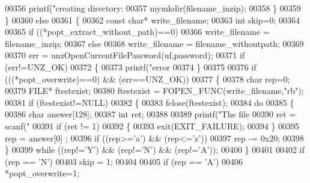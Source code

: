 \begin{DoxyCode}
{{{{{{{{{00356             printf(\textcolor{stringliteral}{"creating directory: %
00357             mymkdir(filename\_inzip);
00358         \}
00359     \}
00360     \textcolor{keywordflow}{else}
00361     \{
00362         \textcolor{keyword}{const} \textcolor{keywordtype}{char}* write\_filename;
00363         \textcolor{keywordtype}{int} skip=0;
00364 
00365         \textcolor{keywordflow}{if} ((*popt\_extract\_without\_path)==0)
00366             write\_filename = filename\_inzip;
00367         \textcolor{keywordflow}{else}
00368             write\_filename = filename\_withoutpath;
00369 
00370         err = unzOpenCurrentFilePassword(uf,password);
00371         \textcolor{keywordflow}{if} (err!=UNZ\_OK)
00372         \{
00373             printf(\textcolor{stringliteral}{"error %
00374         \}
00375 
00376         \textcolor{keywordflow}{if} (((*popt\_overwrite)==0) && (err==UNZ\_OK))
00377         \{
00378             \textcolor{keywordtype}{char} rep=0;
00379             FILE* ftestexist;
00380             ftestexist = FOPEN\_FUNC(write\_filename,\textcolor{stringliteral}{"rb"});
00381             \textcolor{keywordflow}{if} (ftestexist!=NULL)
00382             \{
00383                 fclose(ftestexist);
00384                 \textcolor{keywordflow}{do}
00385                 \{
00386                     \textcolor{keywordtype}{char} answer[128];
00387                     \textcolor{keywordtype}{int} ret;
00388 
00389                     printf(\textcolor{stringliteral}{"The file %
00390                     ret = scanf(\textcolor{stringliteral}{"%
00391                     \textcolor{keywordflow}{if} (ret != 1)
00392                     \{
00393                        exit(EXIT\_FAILURE);
00394                     \}
00395                     rep = answer[0] ;
00396                     \textcolor{keywordflow}{if} ((rep>=\textcolor{charliteral}{'a'}) && (rep<=\textcolor{charliteral}{'z'}))
00397                         rep -= 0x20;
00398                 \}
00399                 \textcolor{keywordflow}{while} ((rep!=\textcolor{charliteral}{'Y'}) && (rep!=\textcolor{charliteral}{'N'}) && (rep!=\textcolor{charliteral}{'A'}));
00400             \}
00401 
00402             \textcolor{keywordflow}{if} (rep == \textcolor{charliteral}{'N'})
00403                 skip = 1;
00404 
00405             \textcolor{keywordflow}{if} (rep == \textcolor{charliteral}{'A'})
00406                 *popt\_overwrite=1;
}}}}}}}}}}}}}
\end{DoxyCode}
